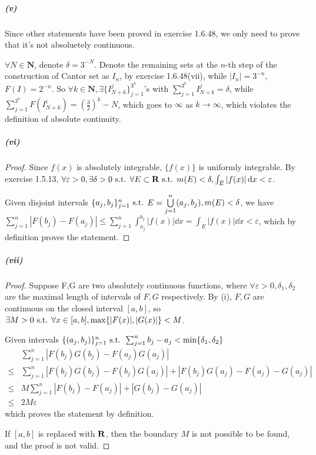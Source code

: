 \documentclass{article}
\begin{document}
\subparagraph{(v)}
Since other statements have been proved in exercise 1.6.48, we only need to prove that it's not absoluetely continuous.

$\forall N\in\mathbf{N}$, denote $\delta=3^{-N}$. Denote the remaining sets at the $n$-th step of the construction of Cantor set as $I_n$, by exercise 1.6.48(vii), while $|I_n|=3^{-n}$, $F(I)=2^{-n}$. So $\forall k\in \mathbf{N},\exists \{I^j_{N+k}\}_{j=1}^{3^k}$'s with $\sum\limits_{j=1}^{3^k}I^j_{N+k}=\delta$, while $\sum\limits_{j=1}^{3^k}F(I^i_{N+k})=(\frac{3}{2})^k-N$, which goes to $\infty$ as $k\to \infty$, which violates the definition of absolute continuity.


\subparagraph{(vi)}
\begin{proof}
Since $f(x)$ is absolutely integrable, $\{f(x)\}$ is uniformly integrable. By exercise 1.5.13, $\forall \varepsilon >0, \exists \delta>0\text{ s.t. } \forall E\subset \mathbf{R}\text{ s.t. } m(E)<\delta, \int_E|f(x)|\,\mathrm{d} x<\varepsilon$.

Given disjoint intervals $\{a_j,b_j\}_{j=1}^n \text{ s.t. } E=\bigcup\limits_{j=1}^n (a_j,b_j), m(E)<\delta$, we have $\sum\limits_{j=1}^n |F(b_j)-F(a_j)|\leq\sum\limits_{j=1}^n \int_{a_j}^{b_j}|f(x)|\dd x=\int_{E}|f(x)|\dd x<\varepsilon$, which by definition proves the statement.
\end{proof}

\subparagraph{(vii)}
\begin{proof}
Suppose F,G are two absolutely continuous functions, where $\forall\varepsilon>0, \delta_1,\delta_2$ are the maximal length of intervals of $F,G$ respectively. By (i), $F,G$ are continuous on the closed interval $[a,b]$, so $\exists M>0\text{ s.t. } \forall x\in [a,b], \max\{|F(x)|,|G(x)|\}<M$.

Given intervals $\{(a_j,b_j)\}_{j=1}^n\text{ s.t. } \sum_{j=1}^n b_j-a_j<\min\{\delta_1,\delta_2\}$
\[\begin{aligned}
&\sum\limits_{j=1}^n|F(b_j)G(b_j)-F(a_j)G(a_j)|\\
\leq&\sum\limits_{j=1}^n|F(b_j)G(b_j)-F(b_j)G(a_j)|+|F(b_j)G(a_j)-F(a_j)-G(a_j)|\\
\leq&M\sum\limits_{j=1}^n|F(b_j)-F(a_j)|+|G(b_j)-G(a_j)|\\
\leq&2M\varepsilon
\end{aligned}\]
which proves the statement by definition.

If $[a,b]$ is replaced with $\mathbf{R}$, then the boundary $M$ is not possible to be found, and the proof is not valid. 
\end{proof}
\end{document}
